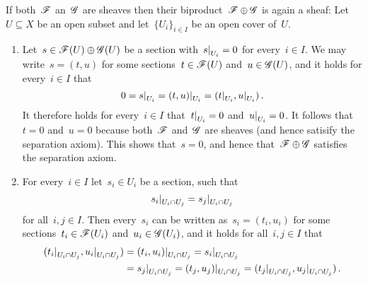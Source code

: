 \begin{example}
\begin{enumerate}
\begin{description}[font=\bfseries]
          If both~$\mathscr{F}$ an~$\mathscr{G}$ are sheaves then their biproduct~$\mathscr{F} \oplus \mathscr{G}$ is again a sheaf:
          Let~$U \subseteq X$ be an open subset and let~$\{ U_i \}_{i \in I}$ be an open cover of~$U$.
          \begin{enumerate}[label=(S\arabic*)]
            \item
              Let~$s \in \mathscr{F}(U) \oplus \mathscr{G}(U)$ be a section with~$\restrict{s}{U_i} = 0$ for every~$i \in I$.
              We may write~$s = (t,u)$ for some sections~$t \in \mathscr{F}(U)$ and~$u \in \mathscr{G}(U)$, and it holds for every~$i \in I$ that
              \[
                  0
                = \restrict{s}{U_i}
                = \restrict{(t,u)}{U_i}
                = ( \restrict{t}{U_i}, \restrict{u}{U_i} ) \,.
              \]
              It therefore holds for every~$i \in I$ that~$\restrict{t}{U_i} = 0$ and~$\restrict{u}{U_i} = 0$.
              It follows that~$t = 0$ and~$u = 0$ because both~$\mathscr{F}$ and~$\mathscr{G}$ are sheaves (and hence satisify the separation axiom).
              This shows that~$s = 0$, and hence that~$\mathscr{F} \oplus \mathscr{G}$ satisfies the separation axiom.
            \item
              For every~$i \in I$ let~$s_i \in U_i$ be a section, such that
              \[
                  \restrict{s_i}{U_i \cap U_j}
                = \restrict{s_j}{U_i \cap U_j}
              \]
              for all~$i,j \in I$.
              Then every~$s_i$ can be written as~$s_i = (t_i, u_i)$ for some sections~$t_i \in \mathscr{F}(U_i)$ and~$u_i \in \mathscr{G}(U_i)$, and it holds for all~$i, j \in I$ that
              \begin{align*}
                    (\restrict{t_i}{U_i \cap U_j}, \restrict{u_i}{U_i \cap U_j})
                &=  \restrict{(t_i, u_i)}{U_i \cap U_j}
                 =  \restrict{s_i}{U_i \cap U_j}  \\
                &=  \restrict{s_j}{U_i \cap U_j}
                 =  \restrict{(t_j, u_j)}{U_i \cap U_j}
                 =  (\restrict{t_j}{U_i \cap U_j}, \restrict{u_j}{U_i \cap U_j}) \,.
              \end{align*}

\end{enumerate}
\end{description}
\end{enumerate}
\end{example}
